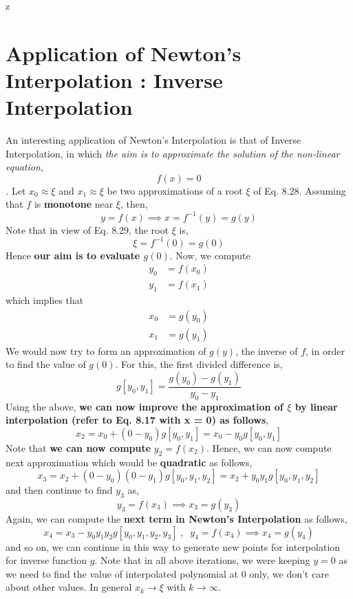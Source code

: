 z\documentclass[a4paper,12pt,twoside]{book}
\newcommand{\nll}[0]{\newline\newline}
\newcommand{\tit}[1]{\textit{#1}}
\begin{document}
\section{Application of Newton's Interpolation : Inverse Interpolation}
An interesting application of Newton's Interpolation is that of Inverse Interpolation, in which \tit{the aim is to approximate the solution of the non-linear equation,
\begin{equation}
    f(x) = 0
\end{equation}
.}
Let $x_0 \approx \xi$ and $x_1 \approx \xi$ be two approximations of a root $\xi$ of Eq. 8.28. Assuming that $f$ is \textbf{monotone} near $\xi$, then,
\begin{equation}
    y = f(x) \implies x = f^{-1}(y) = g(y)
\end{equation}
Note that in view of Eq. 8.29, the root $\xi$ is,
\[\xi = f^{-1}(0) = g(0)\]
Hence \textbf{our aim is to evaluate $g(0)$}.
\nll
Now, we compute
\begin{equation*}
    \begin{split}
        y_0 &= f(x_0)\\
        y_1 &= f(x_1)
    \end{split}
\end{equation*}
which implies that
\begin{equation*}
    \begin{split}
        x_0 &= g(y_0)\\
        x_1 &= g(y_1)
    \end{split}
\end{equation*}
We would now try to form an approximation of $g(y)$, the inverse of $f$, in order to find the value of $g(0)$. For this, the first divided difference is,
\[g[y_0,y_1] = \frac{g(y_0) - g(y_1)}{y_0 - y_1}\]
Using the above, \textbf{we can now improve the approximation of $\xi$ by linear interpolation (refer to Eq. 8.17 with x = 0) as follows},
\begin{equation}
    \boxed{x_2 = x_0 + (0-y_0)g[y_0,y_1] = x_0 - y_0 g[y_0,y_1]}
\end{equation}
Note that \textbf{we can now compute} $y_2 = f(x_2)$. Hence, we can now compute next approximation which would be \textbf{quadratic} as follows,
\[ \boxed{x_3 = x_2 + (0- y_0)(0-y_1)g[y_0,y_1,y_2] = x_2 + y_0y_1g[y_0,y_1,y_2]} \]
and then continue to find $y_3$ as,
\[y_3 = f(x_3) \implies x_3 = g(y_3)\]
Again, we can compute the \textbf{next term in Newton's Interpolation} as follows,
\[ x_4 = x_3 - y_0y_1y_2g[y_0,y_1,y_2,y_3]\;,\;\; y_4 = f(x_4) \implies x_4 = g(y_4) \]
and so on, we can continue in this way to generate new points for interpolation for inverse function $g$. Note that in all above iterations, we were keeping $y=0$ as we need to find the value of interpolated polynomial at $0$ only, we don't care about other values.
\nll
In general $x_k \to \xi$ with $k\to \infty$.
\end{document}
